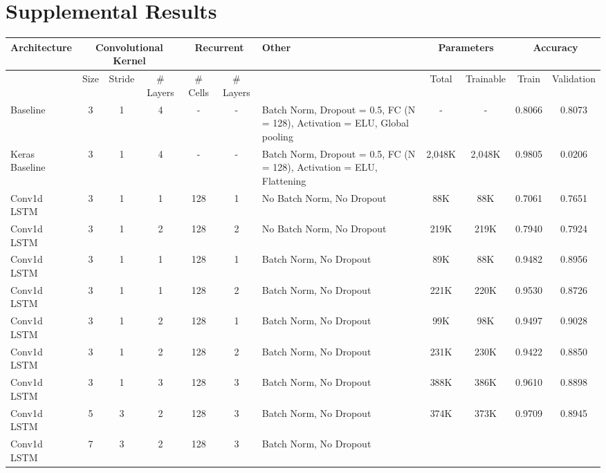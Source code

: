 \documentclass{article}
\begin{document}
\section{Supplemental Results}
\begin{table}[!htbp]
  \resizebox{\textwidth}{!} {
    \begin{tabular} { |m{3cm}|c|c|c|c|c|m{3cm}|c|c|c|c| }
      \hline
      Architecture & \multicolumn{3}{|c|}{Convolutional Kernel} &
      \multicolumn{2}{|c|}{Recurrent} & Other &
      \multicolumn{2}{|c|}{Parameters} & \multicolumn{2}{|c|}{Accuracy} \\
      \hline
      & Size & Stride & \# Layers &
      \# Cells & \# Layers & &
      Total & Trainable & Train & Validation \\ \hline
      \hline
      Baseline & 3 & 1 & 4 &
      - & - & Batch Norm, Dropout = 0.5, FC (N = 128), Activation =
      ELU, Global pooling &
      - & - & 0.8066 & 0.8073 \\ \hline
      \hline
      Keras Baseline & 3 & 1 & 4 &
      - & - & Batch Norm, Dropout = 0.5, FC (N = 128), Activation =
      ELU, Flattening &
      2,048K & 2,048K & 0.9805 & 0.0206 \\ \hline
      \hline
      Conv1d LSTM & 3 & 1 & 1 &
      128 & 1 & No Batch Norm, No Dropout &
      88K & 88K & 0.7061 & 0.7651 \\ \hline
      Conv1d LSTM & 3 & 1 & 2 &
      128 & 2 & No Batch Norm, No Dropout &
      219K & 219K & 0.7940 & 0.7924 \\ \hline
      Conv1d LSTM & 3 & 1 & 1 &
      128 & 1 & Batch Norm, No Dropout &
      89K & 88K & 0.9482 & 0.8956 \\ \hline
      Conv1d LSTM & 3 & 1 & 1 &
      128 & 2 & Batch Norm, No Dropout &
      221K & 220K & 0.9530 & 0.8726 \\ \hline
      Conv1d LSTM & 3 & 1 & 2 &
      128 & 1 & Batch Norm, No Dropout &
      99K & 98K & 0.9497 & 0.9028 \\ \hline
      Conv1d LSTM & 3 & 1 & 2 &
      128 & 2 & Batch Norm, No Dropout &
      231K & 230K & 0.9422 & 0.8850 \\ \hline
      Conv1d LSTM & 3 & 1 & 3 &
      128 & 3 & Batch Norm, No Dropout &
      388K & 386K & 0.9610 & 0.8898 \\ \hline
      \hline
      Conv1d LSTM & 5 & 3 & 2 &
      128 & 3 & Batch Norm, No Dropout &
      374K & 373K & 0.9709 & 0.8945 \\ \hline
      Conv1d LSTM & 7 & 3 & 2 &
      128 & 3 & Batch Norm, No Dropout &

\end{tabular}}
\end{table}
\end{document}
